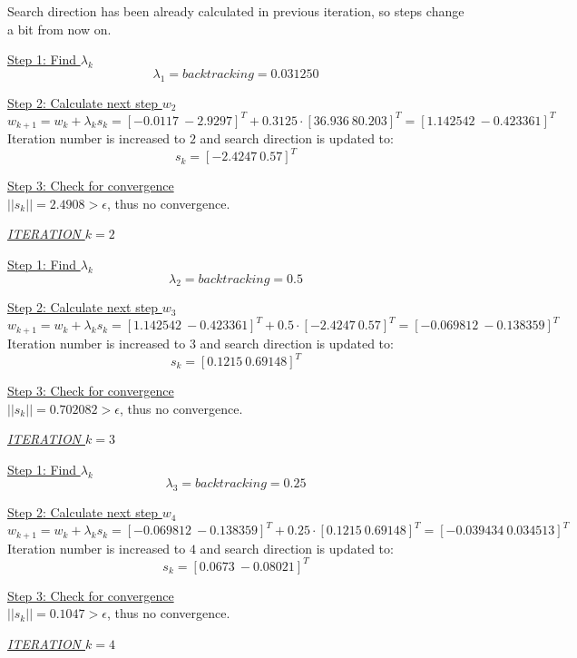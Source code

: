 Search direction has been already calculated in previous iteration, so steps change a bit from now on.

\underline{Step 1: Find $\lambda_k$}
\[
\lambda_1 = \textit{backtracking} = 0.031250
\]

\underline{Step 2: Calculate next step $w_{2}$}
\[
w_{k+1} = w_k + \lambda_k s_k = [-0.0117\  -2.9297]^T + 0.3125 \cdot [36.936\  80.203]^T = [1.142542\ -0.423361]^T
\]
Iteration number is increased to $2$ and search direction is updated to:
\[
s_k = [-2.4247\ 0.57]^T
\]

\underline{Step 3: Check for convergence}\\[2mm]
$||s_k|| = 2.4908 > \epsilon$, thus no convergence.\\[3mm]


\begin{center}
	\underline{\textit{ITERATION} $k=2$}
\end{center}

\underline{Step 1: Find $\lambda_k$}
\[
\lambda_2 = \textit{backtracking} = 0.5
\]

\underline{Step 2: Calculate next step $w_{3}$}
\[
w_{k+1} = w_k + \lambda_k s_k = [1.142542\ -0.423361]^T + 0.5 \cdot [−2.4247\  0.57]^T = [-0.069812\ -0.138359]^T
\]
Iteration number is increased to $3$ and search direction is updated to:
\[
s_k = [0.1215\ 0.69148]^T
\]

\underline{Step 3: Check for convergence}\\[2mm]
$||s_k|| = 0.702082 > \epsilon$, thus no convergence.\\[3mm]


\begin{center}
	\underline{\textit{ITERATION $k=3$}}
\end{center}

\underline{Step 1: Find $\lambda_k$}
\[
\lambda_3 = \textit{backtracking} = 0.25
\]

\underline{Step 2: Calculate next step $w_{4}$}
\[
w_{k+1} = w_k + \lambda_k s_k = [-0.069812\ -0.138359]^T + 0.25 \cdot [0.1215\  0.69148]^T = [-0.039434\ 0.034513]^T
\]
Iteration number is increased to $4$ and search direction is updated to:
\[
s_k = [0.0673\ -0.08021]^T
\]

\underline{Step 3: Check for convergence}\\[2mm]
$||s_k|| = 0.1047 > \epsilon$, thus no convergence.\\[3mm]


\begin{center}
	\underline{\textit{ITERATION $k=4$}}
\end{center}

